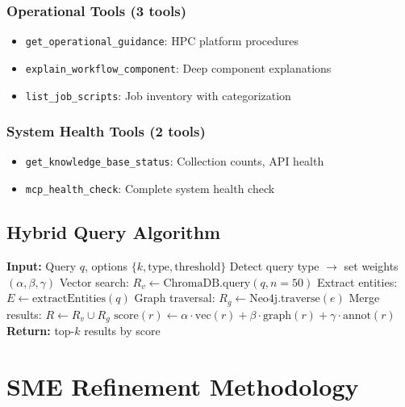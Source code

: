 \documentclass[11pt,letterpaper]{article}
\begin{document}
\subsubsection{Operational Tools (3 tools)}
\begin{itemize}
    \item \texttt{get\_operational\_guidance}: HPC platform procedures
    \item \texttt{explain\_workflow\_component}: Deep component explanations
    \item \texttt{list\_job\_scripts}: Job inventory with categorization
\end{itemize}

\subsubsection{System Health Tools (2 tools)}
\begin{itemize}
    \item \texttt{get\_knowledge\_base\_status}: Collection counts, API health
    \item \texttt{mcp\_health\_check}: Complete system health check
\end{itemize}

\subsection{Hybrid Query Algorithm}

\begin{algorithm}
\caption{Hybrid RAG Query}
\begin{algorithmic}[1]
\STATE \textbf{Input:} Query $q$, options $\{k, \text{type}, \text{threshold}\}$
\STATE Detect query type $\rightarrow$ set weights $(\alpha, \beta, \gamma)$
\STATE Vector search: $R_v \leftarrow \text{ChromaDB.query}(q, n=50)$
\STATE Extract entities: $E \leftarrow \text{extractEntities}(q)$
    \STATE Graph traversal: $R_g \leftarrow \text{Neo4j.traverse}(e)$
\ENDFOR
\STATE Merge results: $R \leftarrow R_v \cup R_g$
    \STATE $\text{score}(r) \leftarrow \alpha \cdot \text{vec}(r) + \beta \cdot \text{graph}(r) + \gamma \cdot \text{annot}(r)$
\ENDFOR
\STATE \textbf{Return:} top-$k$ results by score
\end{algorithmic}
\end{algorithm}

\section{SME Refinement Methodology}
\end{document}
